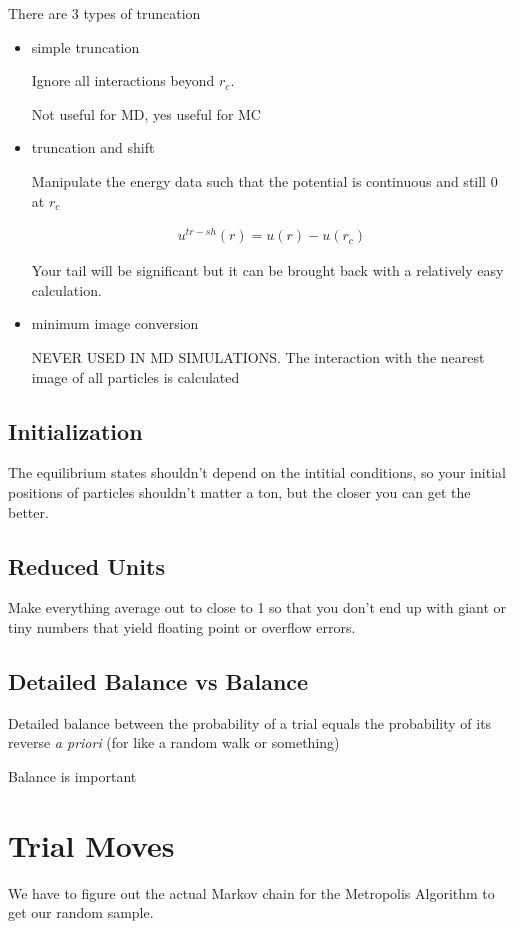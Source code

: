 \documentclass[fleqn]{report}
\newcommand{\equations} [1] {
\begin{gather*}
#1
\end{gather*}
}
\begin{document}
There are 3 types of truncation 
\begin{itemize}
    \item 
    simple truncation 

    Ignore all interactions beyond $r_c$.

    Not useful for MD, yes useful for MC
    \item 
    truncation and shift 

    Manipulate the energy data such that the potential is continuous 
    and still 0 at $r_c$ 

    \equations{
        u^{tr - sh}(r) = u(r) - u(r_c)
    }

    Your tail will be significant but it can be brought back with a 
    relatively easy calculation. 
    \item 
    minimum image conversion 

    NEVER USED IN MD SIMULATIONS. The interaction 
    with the nearest image of all particles is calculated 
\end{itemize}

\subsection{Initialization}
The equilibrium states shouldn't depend on the intitial conditions, so 
your initial positions of particles shouldn't matter a ton, but 
the closer you can get the better. 

\subsection{Reduced Units}
Make everything average out to close to 1 so that you don't end up 
with giant or tiny numbers that yield floating point or overflow errors. 


\subsection{Detailed Balance vs Balance}
Detailed balance between the probability of a trial equals the probability 
of its reverse \textit{a priori} (for like a random walk or something)

Balance is important 

\section{Trial Moves}
We have to figure out the actual Markov chain for the Metropolis Algorithm 
to get our random sample. 
\end{document}
